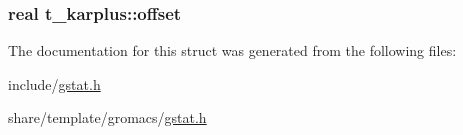 \hypertarget{structt__karplus_acdd4e5ec9a4a938c9844bbae6205ba35}{
\subsubsection[{offset}]{\setlength{\rightskip}{0pt plus 5cm}real {\bf t\-\_\-karplus\-::offset}}}\label{structt__karplus_acdd4e5ec9a4a938c9844bbae6205ba35}


\-The documentation for this struct was generated from the following files\-:\begin{DoxyCompactItemize}
\item 
include/\hyperlink{include_2gstat_8h}{gstat.\-h}\item 
share/template/gromacs/\hyperlink{share_2template_2gromacs_2gstat_8h}{gstat.\-h}\end{DoxyCompactItemize}
